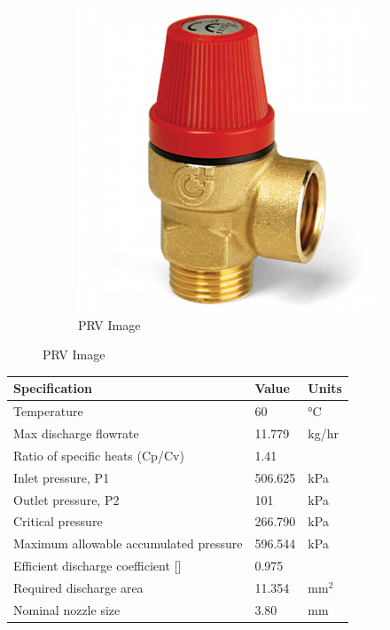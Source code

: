 \begin{figure}[H]
\begin{subfigure}{0.49\linewidth}
        \includegraphics[width=\linewidth]{chapters/Z-support/figures/product_a_l_altecnic-caleffi-safety-relief-valve-1-2-6-bar-312460-small.jpg}
        \caption{PRV Image \cite{unvented_components_europe_caleffi_nodate}}
    \end{subfigure}
\end{figure}

\begin{table}[H]
\centering
\begin{tabular}{@{}l|l|l@{}}
\toprule
\textbf{Specification}                    & \textbf{Value} & \textbf{Units} \\ \midrule
Temperature                               & 60             & °C             \\ \midrule
Max discharge   flowrate                  & 11.779         & kg/hr          \\ \midrule
Ratio of   specific heats (Cp/Cv)  \cite{api_standard_520_sizing_2013}      & 1.41           &                \\ \midrule
Inlet   pressure, P1                      & 506.625        & kPa            \\ \midrule
Outlet   pressure, P2                     & 101            & kPa            \\ \midrule
Critical   pressure                       & 266.790        & kPa            \\ \midrule
Maximum   allowable accumulated  pressure & 596.544        & kPa            \\ \midrule
Efficient   discharge coefficient  []        & 0.975          &                \\ \midrule
Required   discharge area                 & 11.354         & mm$^2$            \\ \midrule
Nominal nozzle   size                     & 3.80           & mm             \\ \bottomrule
\end{tabular}
\end{table}


